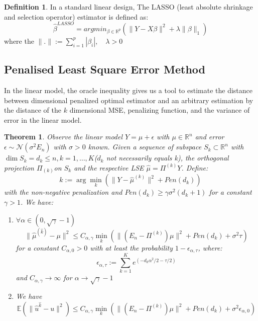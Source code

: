\documentclass[a4paper,12pt, oneside, fleqn]{book}
\newtheorem{theorem}{Theorem}[section]
\theoremstyle{definition}
\newtheorem{definition}{Definition}[section]
\theoremstyle{remark}
\begin{document}
\begin{definition}
In a standard linear design, The LASSO (least absolute shrinkage and selection operator) estimator is defined as:
\begin{equation}
    \hat{\beta}^{LASSO} =  argmin_{\beta \in \mathbb{R}^p}( \|Y - X\beta \|^2 + \lambda \| \beta \|_1)
\end{equation}
where the $\|.\| := \sum_{i = 1}^{p} |\beta_i|, \quad \lambda > 0$
\end{definition}
\newpage



\subsection{Penalised Least Square Error Method}
In the linear model, the oracle inequality gives us a tool to estimate the distance between dimensional penalized optimal estimator and an arbitrary estimation by the distance of the $k$ dimensional MSE, penalizing function, and the variance of error in the linear model.  

\begin{theorem}
Observe the linear model $Y = \mu + \epsilon$ with $\mu \in \mathbb{R}^n$ and error $\epsilon \sim \mathcal{N}(\sigma^2 E_n)$ with $\sigma > 0$ known. Given a sequence of subspace $S_k \subset \mathbb{R}^n$ with $\dim S_k = d_k \leq n, k = 1, \dots, K$($d_k$ not necessarily equals k), the orthogonal projection $\Pi_{(k)}$on $S_k$ and the respective LSE $\hat{\mu} = \Pi^{(k)} Y$. Define:
\begin{equation}
    \hat{k} := \arg\min_k (\| Y - \hat{\mu}^{(k)} \|^2 + Pen(d_k))
\end{equation}          
with the non-negative penalization and $Pen(d_k) \geq \gamma \sigma^2 (d_k + 1)$ for a constant $\gamma > 1$. We have:
\begin{enumerate}
    \item $\forall \alpha \in (0,\sqrt{\gamma} - 1)$  
    \begin{equation}
        \| \hat{\mu}^{(\hat{k})} - \mu \|^2 \leq C_{\alpha, \gamma} \min_k (\| (E_n - \Pi^{(k)})\mu \|^2 + Pen(d_k) + \sigma^2 \tau)
    \end{equation}
    for a constant $C_{\alpha, 0} > 0$ with at least the probability $1 - \epsilon_{\alpha, \tau}$, where:
    \begin{equation}
        \epsilon_{\alpha, \tau} := \sum_{k = 1}^{K} e^{(-d_k \alpha^2/2 - \tau/2)}
    \end{equation}
    and $C_{\alpha, \gamma} \longrightarrow \infty$ for $\alpha \longrightarrow \sqrt{\gamma} -1$
    
    \item We have
    \begin{equation*}
    	\mathbb{E}(\|\hat{u}^{\hat{k}} - u \|^2) \leq C_{\alpha, \gamma} \min_k (\| (E_n - \Pi^{(k)})\mu \|^2 + Pen(d_k) + \sigma^2 \epsilon_{\alpha, 0})
    \end{equation*}
\end{enumerate}
\end{theorem}
\end{document}
